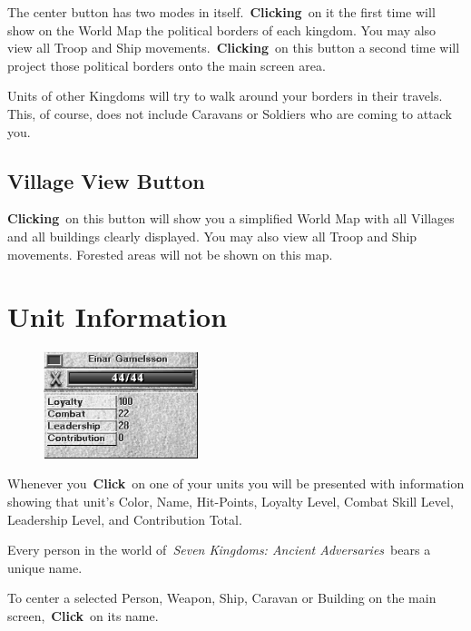 The center button has two modes in itself. \textbf{Clicking} on it the first time will show on the World Map the political borders of each kingdom. You may also view all Troop and Ship movements. \textbf{Clicking} on this button a second time will project those political borders onto the main screen area.

Units of other Kingdoms will try to walk around your borders in their travels. This, of course, does not include Caravans or Soldiers who are coming to attack you.

\subsection{Village View Button}

\textbf{Clicking} on this button will show you a simplified World Map with all Villages and all buildings clearly displayed. You may also view all Troop and Ship movements. Forested areas will not be shown on this map.

\clearpage

\section{Unit Information}

\begin{figure}
	\vspace{-20pt}
	\begin{center}
		\includegraphics[width=0.4\textwidth]{Iunitinfo}
	\end{center}
	\vspace{-20pt}
\end{figure}

Whenever you \textbf{Click} on one of your units you will be presented with information showing that unit’s Color, Name, Hit-Points, Loyalty Level, Combat Skill Level, Leadership Level, and Contribution Total.

Every person in the world of \textit{Seven Kingdoms: Ancient Adversaries} bears a unique name.

To center a selected Person, Weapon, Ship, Caravan or Building on the main screen, \textbf{Click} on its name.

